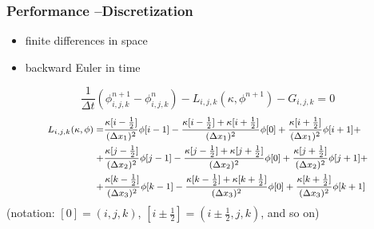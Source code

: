 \documentclass{beamer}
\begin{document}
\begin{frame}
  \frametitle{Performance --Discretization}
\begin{itemize}
\item finite differences in space
\item backward Euler in time
\end{itemize}
\vfill
\begin{equation}
  \frac{1}{\Delta t}(\phi^{n+1}_{i,j,k}-\phi^{n}_{i,j,k}) - 
  L_{i,j,k}(\kappa,\phi^{n+1}) - G_{i,j,k} = 0 
\end{equation}
\begin{equation}
\footnotesize
\begin{split}
    L_{i,j,k}(\kappa,\phi) = %
     &\frac{\kappa[i-\onehalf]}{(\Delta x_1)^2}                \phi[i-1]%
     -\frac{\kappa[i-\onehalf]+\kappa[i+\onehalf]}{(\Delta x_1)^2} \phi[0]%
     +\frac{\kappa[i+\onehalf]}{(\Delta x_1)^2}               \phi[i+1] +\\
    +&\frac{\kappa[j-\onehalf]}{(\Delta x_2)^2}               \phi[j-1]%
     -\frac{\kappa[j-\onehalf]+\kappa[j+\onehalf]}{(\Delta x_2)^2} \phi[0]%
     +\frac{\kappa[j+\onehalf]}{(\Delta x_2)^2}               \phi[j+1] +\\
    +&\frac{\kappa[k-\onehalf]}{(\Delta x_3)^2}               \phi[k-1]%
     -\frac{\kappa[k-\onehalf]+\kappa[k+\onehalf]}{(\Delta x_3)^2} \phi[0]%
     +\frac{\kappa[k+\onehalf]}{(\Delta x_3)^2}               \phi[k+1]
\end{split}
\end{equation}
(notation: %
$[0]=(i,j,k)$, $[i\pm\frac{1}{2}]=(i\pm\frac{1}{2},j,k)$, %
and so on)
\end{frame}
\end{document}
